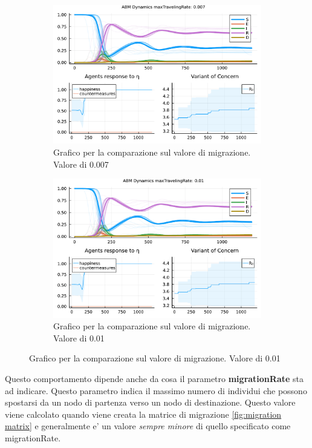 \begin{figure}[!hb]
\begin{subfigure}[b]{0.45\textwidth}
		\includegraphics[width=\textwidth]{img/SocialNetworkABM_3_MTR.pdf}
		\caption{Grafico per la comparazione sul valore di migrazione. Valore di 0.007}
		\label{fig:comparison_maxTravelingRate_midh}
	\end{subfigure}
	\hfill
	\begin{subfigure}[b]{0.45\textwidth}
		\centering
		\includegraphics[width=\textwidth]{img/SocialNetworkABM_4_MTR.pdf}
		\caption{Grafico per la comparazione sul valore di migrazione. Valore di 0.01}
		\label{fig:comparison_maxTravelingRate_high}
	\end{subfigure}
\end{figure}

Questo comportamento dipende anche da cosa il parametro \textbf{migrationRate} sta ad indicare. Questo parametro indica il massimo numero 
di individui che possono spostarsi da un nodo di partenza verso un nodo di destinazione. Questo valore viene calcolato quando viene 
creata la matrice di migrazione \ref{fig:migration matrix} e generalmente e' un valore \emph{sempre minore} di quello specificato come migrationRate.
\newpage

